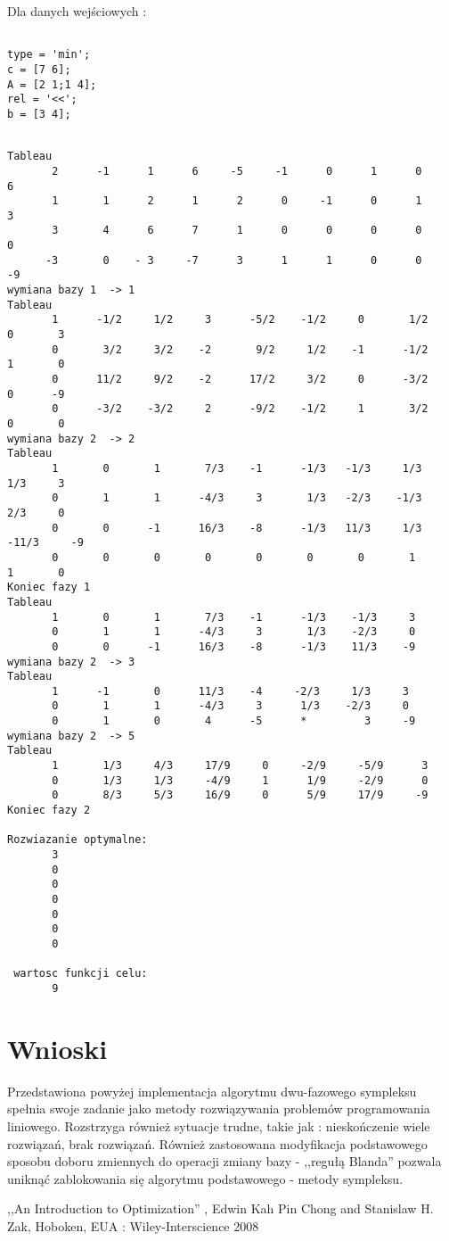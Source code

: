 \documentclass{classrep}
\begin{document}
Dla danych wejściowych :


\begin{Verbatim}[frame=lines
]

type = 'min';
c = [7 6];
A = [2 1;1 4];
rel = '<<';
b = [3 4];
\end{Verbatim}

\begin{Verbatim}[frame=lines
]

Tableau
       2      -1      1      6     -5     -1      0      1      0      6 
       1       1      2      1      2      0     -1      0      1      3
       3       4      6      7      1      0      0      0      0      0
      -3       0    - 3     -7      3      1      1      0      0     -9 
wymiana bazy 1  -> 1
Tableau
       1      -1/2     1/2     3      -5/2    -1/2     0       1/2     0       3
       0       3/2     3/2    -2       9/2     1/2    -1      -1/2     1       0
       0      11/2     9/2    -2      17/2     3/2     0      -3/2     0      -9
       0      -3/2    -3/2     2      -9/2    -1/2     1       3/2     0       0
wymiana bazy 2  -> 2
Tableau
       1       0       1       7/3    -1      -1/3   -1/3     1/3     1/3     3
       0       1       1      -4/3     3       1/3   -2/3    -1/3     2/3     0
       0       0      -1      16/3    -8      -1/3   11/3     1/3   -11/3     -9
       0       0       0       0       0       0       0       1       1       0
Koniec fazy 1
Tableau
       1       0       1       7/3    -1      -1/3    -1/3     3       
       0       1       1      -4/3     3       1/3    -2/3     0       
       0       0      -1      16/3    -8      -1/3    11/3    -9       
wymiana bazy 2  -> 3
Tableau
       1      -1       0      11/3    -4     -2/3     1/3     3       
       0       1       1      -4/3     3      1/3    -2/3     0       
       0       1       0       4      -5      *         3	  -9       
wymiana bazy 2  -> 5
Tableau
       1       1/3     4/3     17/9     0     -2/9     -5/9      3       
       0       1/3     1/3     -4/9     1      1/9     -2/9      0       
       0       8/3     5/3     16/9     0      5/9     17/9     -9       
Koniec fazy 2

Rozwiazanie optymalne:
       3       
       0       
       0       
       0       
       0       
       0       
       0       

 wartosc funkcji celu:
       9    
\end{Verbatim}

\section{Wnioski}
Przedstawiona powyżej implementacja algorytmu dwu-fazowego sympleksu spełnia swoje zadanie jako metody rozwiązywania problemów programowania liniowego. Rozstrzyga również sytuacje trudne, takie jak : nieskończenie wiele rozwiązań, brak rozwiązań. Również zastosowana modyfikacja podstawowego sposobu doboru zmiennych do operacji zmiany bazy - ,,regułą Blanda'' pozwala uniknąć zablokowania się algorytmu podstawowego - metody sympleksu.

\begin{thebibliography}{9}
 ,,An Introduction to Optimization'' , Edwin Kah Pin Chong and Stanislaw H. Zak, Hoboken, EUA : Wiley-Interscience 2008
\end{thebibliography}
\end{document}
